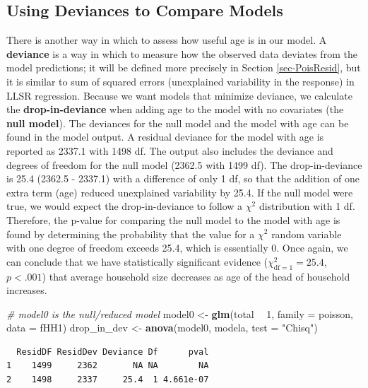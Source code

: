 \documentclass[
]{krantz}
\newenvironment{Shaded}{\begin{snugshade}}{\end{snugshade}}
\newcommand{\CommentTok}[1]{\textcolor[rgb]{0.37,0.37,0.37}{\textit{#1}}}
\newcommand{\DataTypeTok}[1]{\textcolor[rgb]{0.27,0.27,0.27}{#1}}
\newcommand{\DecValTok}[1]{\textcolor[rgb]{0.06,0.06,0.06}{#1}}
\newcommand{\KeywordTok}[1]{\textcolor[rgb]{0.27,0.27,0.27}{\textbf{#1}}}
\newcommand{\NormalTok}[1]{#1}
\newcommand{\OperatorTok}[1]{\textcolor[rgb]{0.43,0.43,0.43}{\textbf{#1}}}
\newcommand{\StringTok}[1]{\textcolor[rgb]{0.5,0.5,0.5}{#1}}
\begin{document}
\hypertarget{sec-Devtocompare}{%
\subsection{Using Deviances to Compare Models}\label{sec-Devtocompare}}

There is another way in which to assess how useful age is in our model. A \textbf{deviance}  is a way in which to measure how the observed data deviates from the model predictions; it will be defined more precisely in Section \ref{sec-PoisResid}, but it is similar to sum of squared errors (unexplained variability in the response) in LLSR regression. Because we want models that minimize deviance, we calculate the \textbf{drop-in-deviance}  when adding age to the model with no covariates (the \textbf{null model}).  The deviances for the null model and the model with age can be found in the model output. A residual deviance for the model with age is reported as 2337.1 with 1498 df. The output also includes the deviance and degrees of freedom for the null model (2362.5 with 1499 df). The drop-in-deviance is 25.4 (2362.5 - 2337.1) with a difference of only 1 df, so that the addition of one extra term (age) reduced unexplained variability by 25.4. If the null model were true, we would expect the drop-in-deviance to follow a \(\chi^2\) distribution with 1 df. Therefore, the p-value for comparing the null model to the model with age is found by determining the probability that the value for a \(\chi^2\) random variable with one degree of freedom exceeds 25.4, which is essentially 0. Once again, we can conclude that we have statistically significant evidence (\(\chi^2_{\text{df} =1}=25.4\), \(p < .001\)) that average household size decreases as age of the head of household increases.

\begin{Shaded}
\begin{Highlighting}[]
\CommentTok{# model0 is the null/reduced model}
\NormalTok{model0 <-}\StringTok{ }\KeywordTok{glm}\NormalTok{(total }\OperatorTok{~}\StringTok{ }\DecValTok{1}\NormalTok{, }\DataTypeTok{family =}\NormalTok{ poisson, }\DataTypeTok{data =}\NormalTok{ fHH1)}
\NormalTok{drop_in_dev <-}\StringTok{ }\KeywordTok{anova}\NormalTok{(model0, modela, }\DataTypeTok{test =} \StringTok{"Chisq"}\NormalTok{)}
\end{Highlighting}
\end{Shaded}

\begin{verbatim}
  ResidDF ResidDev Deviance Df      pval
1    1499     2362       NA NA        NA
2    1498     2337     25.4  1 4.661e-07
\end{verbatim}
\end{document}
